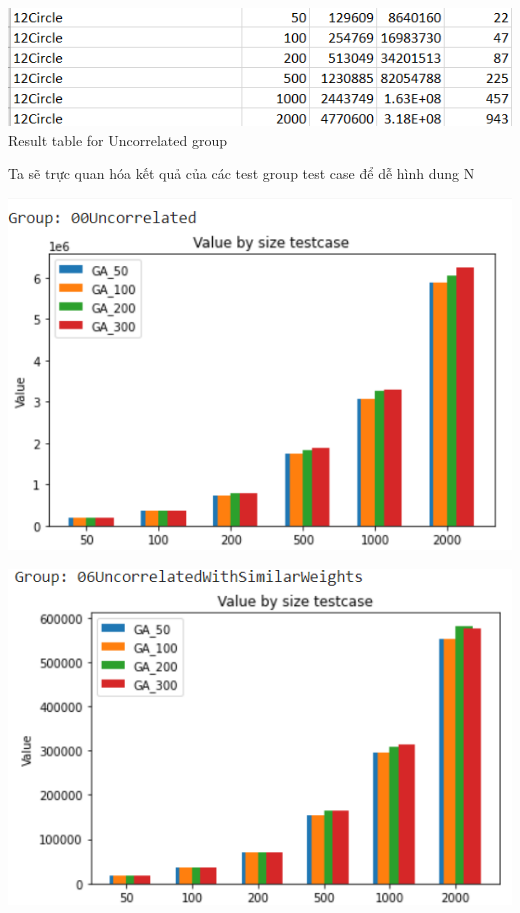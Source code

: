 \documentclass{article}
\begin{document}
\begin{enumerate}
\begin{center}
\end{center}
\begin{center}
    \centering
    \includegraphics[width=15cm]{image/report12.png}
    \\\caption{ Result table for Uncorrelated group}
\end{center}
Ta sẽ trực quan hóa kết quả của các test group test case để dễ hình dung
 N
\begin{center}
    \centering
    \includegraphics[width=15cm]{image/AI1.png}
\end{center}
\begin{center}
    \centering
    \includegraphics[width=15cm]{image/AI2.png}

\end{center}
\end{enumerate}
\end{document}
